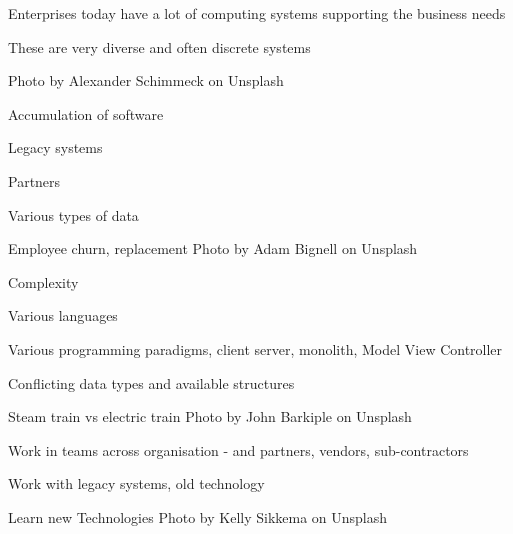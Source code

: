 \documentclass[Screen16to9,17pt]{foils}
\begin{document}



\begin{list2}
\item Enterprises today have a lot of computing systems supporting the business needs
\item These are very diverse and often discrete systems
\end{list2}

\hfill Photo by Alexander Schimmeck on Unsplash



\begin{list2}
\item Accumulation of software
\item Legacy systems
\item Partners
\item Various types of data
\item Employee churn, replacement \hfill Photo by Adam Bignell on Unsplash
\end{list2}




\begin{list2}
\item Complexity
\item Various languages
\item Various programming paradigms, client server, monolith, Model View Controller
\item Conflicting data types and available structures
\item Steam train vs electric train \hfill Photo by John Barkiple on Unsplash

\end{list2}






\begin{list2}
\item Work in teams across organisation - and partners, vendors, sub-contractors
\item Work with legacy systems, old technology
\item Learn new Technologies \hfill Photo by Kelly Sikkema on Unsplash
\end{list2}
\end{document}
